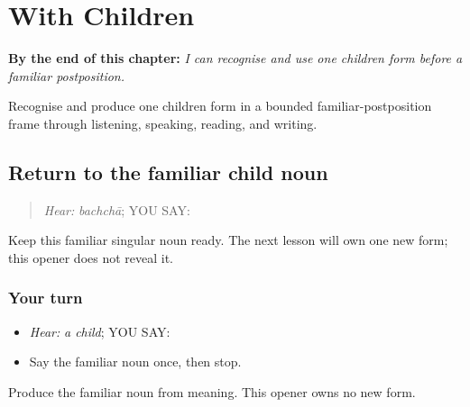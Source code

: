 
\chapter{With Children}
\label{ch:pa-a2-bachchian}

\begin{chapteropening}
\textbf{By the end of this chapter:} \emph{I can recognise and use one children form before a familiar postposition.}

Recognise and produce one children form in a bounded familiar-postposition frame through listening, speaking, reading, and writing.
\end{chapteropening}

\section[\texorpdfstring{\pa{ਬੱਚਾ} (bachchaa)}{ਬੱਚਾ (bachchaa)}]{Return to the familiar child noun}

\label{lesson:PA-C204-child-return}



\begin{quote}
\emph{Hear:} \emph{bachchā}; YOU SAY: \textbf{}
\end{quote}

\begin{grammarlens}[title={Grammar Lens}]
Keep this familiar singular noun ready. The next lesson will own one new form; this opener does not reveal it.
\end{grammarlens}

\subsection*{Your turn}
\begin{itemize}
\raggedright
  \item \emph{Hear:} \emph{a child}; YOU SAY: \textbf{}
  \item Say the familiar noun once, then stop.
\end{itemize}

\begin{tcolorbox}[breakable,colback=teal!4,colframe=teal!35!black,title={Before you move on}]
Produce the familiar noun from meaning. This opener owns no new form.
\end{tcolorbox}

